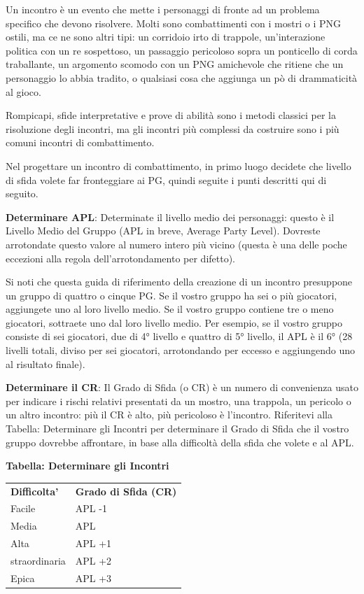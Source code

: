 \documentclass[a4paper,11pt,twoside,openany]{book}
\begin{document}
{Un incontro è un evento che mette i personaggi di fronte ad un problema specifico che devono risolvere. Molti sono combattimenti con i mostri o i PNG ostili, ma ce ne sono altri tipi: un corridoio irto di trappole, un'interazione politica con un re sospettoso, un passaggio pericoloso sopra un ponticello di corda traballante, un argomento scomodo con un PNG amichevole che ritiene che un personaggio lo abbia tradito, o qualsiasi cosa che aggiunga un pò di drammaticità al gioco.

Rompicapi, sfide interpretative e prove di abilità sono i metodi classici per la risoluzione degli incontri, ma gli incontri più complessi da costruire sono i più comuni incontri di combattimento.

Nel progettare un incontro di combattimento, in primo luogo decidete che livello di sfida volete far fronteggiare ai PG, quindi seguite i punti descritti qui di seguito.

\textbf{Determinare APL}: Determinate il livello medio dei personaggi: questo è il Livello Medio del Gruppo (APL in breve, Average Party Level). Dovreste arrotondate questo valore al numero intero più vicino (questa è una delle poche eccezioni alla regola dell'arrotondamento per difetto).

Si noti che questa guida di riferimento della creazione di un incontro presuppone un gruppo di quattro o cinque PG. Se il vostro gruppo ha sei o più giocatori, aggiungete uno al loro livello medio. Se il vostro gruppo contiene tre o meno giocatori, sottraete uno dal loro livello medio. Per esempio, se il vostro gruppo consiste di sei giocatori, due di 4° livello e quattro di 5° livello, il APL è il 6° (28 livelli totali, diviso per sei giocatori, arrotondando per eccesso e aggiungendo uno al risultato finale).

\textbf{Determinare il CR}: Il Grado di Sfida (o CR) è un numero di convenienza usato per indicare i rischi relativi presentati da un mostro, una trappola, un pericolo o un altro incontro: più il CR è alto, più pericoloso è l'incontro. Riferitevi alla Tabella: Determinare gli Incontri per determinare il Grado di Sfida che il vostro gruppo dovrebbe affrontare, in base alla difficoltà della sfida che volete e al APL.

\bigskip

\textbf{Tabella: Determinare gli Incontri}

\begin{tabular}{ll}
\toprule
\textbf{Difficolta'} & \textbf{Grado di Sfida (CR)}\tabularnewline
Facile & APL -1\tabularnewline
Media & APL\tabularnewline
Alta & APL +1\tabularnewline
straordinaria & APL +2\tabularnewline
Epica & APL +3\tabularnewline
\end{tabular}

}
\end{document}
